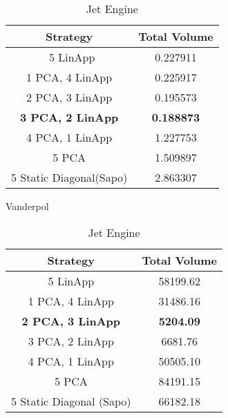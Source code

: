 \begin{table}[h!]
\hspace{1em}
\begin{subtable}[h]{0.45\textwidth}
     \centering
     \begin{tabular}{|c|c|}
     \hline
     Strategy & Total  Volume \\
     \hline\
     5 LinApp & 0.227911 \\
     \hline
     1 PCA, 4 LinApp& 0.225917 \\
     \hline
     2 PCA, 3 LinApp & 0.195573 \\
     \hline
     {\bf 3 PCA, 2 LinApp} & {\bf 0.188873} \\
     \hline
     4 PCA, 1 LinApp & 1.227753\\
     \hline
     5 PCA & 1.509897 \\
     \hline
     5 Static Diagonal(Sapo) & 2.863307  \\
     \hline
    \end{tabular}
    \caption{Vanderpol}
    \label{tab:vdpvol}
 \end{subtable}\hspace{1em}
 \begin{subtable}[h]{0.45\textwidth}
      \centering
      \begin{tabular}{|c|c|}
      \hline
      Strategy & Total  Volume \\
      \hline
      5 LinApp & 58199.62 \\
      \hline
      1 PCA, 4 LinApp & 31486.16 \\
      \hline
      {\bf 2 PCA, 3 LinApp} & {\bf 5204.09}\\
      \hline
      3 PCA, 2 LinApp & 6681.76 \\
      \hline
      4 PCA, 1 LinApp& 50505.10 \\
      \hline
      5 PCA  & 84191.15 \\
      \hline
      5 Static Diagonal (Sapo) & 66182.18  \\
      \hline
     \end{tabular}
     \caption{Jet Engine}
     \label{tab:enginevol}
  \end{subtable}


\end{table}
